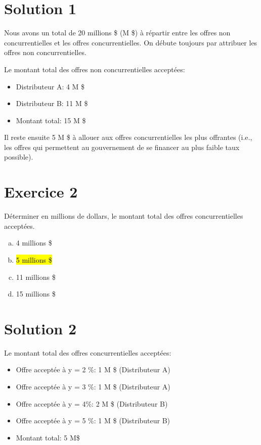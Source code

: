 \documentclass[10pt,a4paper]{article}
\begin{document}
\section*{Solution 1}
Nous avons un total de 20 millions \$ (M \$) à répartir entre les offres non concurrentielles et les offres concurrentielles. On débute toujours par attribuer les offres non concurrentielles.

\vspace{1cm}

Le montant total des offres non concurrentielles acceptées:
\begin{itemize}
\item Distributeur A:   4 M \$
\item Distributeur B: 11 M \$
\item Montant total: 15 M \$   
\end{itemize}
Il reste ensuite 5 M \$ à allouer aux offres concurrentielles les plus offrantes (i.e., les offres qui permettent au gouvernement de se financer au plus faible taux possible).

\newpage

\section*{Exercice 2}
Déterminer en millions de dollars,  le montant total des offres concurrentielles acceptées.

\begin{enumerate}[a)]
\item 4 millions \$
\item \hl{5 millions \$}
\item 11 millions \$
\item 15 millions \$
\end{enumerate}

\section*{Solution 2}
Le montant total des offres concurrentielles acceptées:
\begin{itemize}
\item Offre acceptée à y = 2 \%: 1 M \$ (Distributeur A)
\item Offre acceptée à y = 3 \%: 1 M \$ (Distributeur A)
\item Offre acceptée à y = 4\%: 2 M \$ (Distributeur B)
\item Offre acceptée à y = 5 \%: 1 M \$ (Distributeur B)
\item Montant total:                      5 M\$
\end{itemize}
\end{document}

